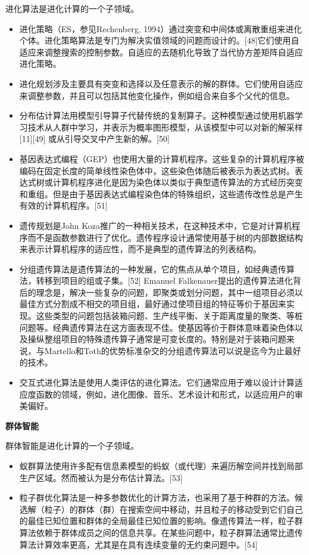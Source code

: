 进化算法是进化计算的一个子领域。
\begin{itemize}
\item 进化策略（ES，参见Rechenberg, 1994）通过突变和中间体或离散重组来进化个体。进化策略算法是专门为解决实值领域的问题而设计的。[48]它们使用自适应来调整搜索的控制参数。自适应的去随机化导致了当代协方差矩阵自适应进化策略。
\item 进化规划涉及主要具有突变和选择以及任意表示的解的群体。它们使用自适应来调整参数，并且可以包括其他变化操作，例如组合来自多个父代的信息。
\item 分布估计算法用模型引导算子代替传统的复制算子。这种模型通过使用机器学习技术从人群中学习，并表示为概率图形模型，从该模型中可以对新的解采样[11][49] 或从引导交叉中产生新的解。[50]
\item 基因表达式编程（GEP）也使用大量的计算机程序。这些复杂的计算机程序被编码在固定长度的简单线性染色体中，这些染色体随后被表示为表达式树。表达式树或计算机程序进化是因为染色体以类似于典型遗传算法的方式经历突变和重组。但是由于基因表达式编程染色体的特殊组织，这些遗传改性总是产生有效的计算机程序。[51]
\item 遗传规划是John Koza推广的一种相关技术，在这种技术中，它是对计算机程序而不是函数参数进行了优化。遗传程序设计通常使用基于树的内部数据结构来表示计算机程序的适应性，而不是典型的遗传算法的列表结构。
\item 分组遗传算法是遗传算法的一种发展，它的焦点从单个项目，如经典遗传算法，转移到项目的组或子集。[52] Emanuel Falkenauer提出的遗传算法进化背后的理念是，解决一些复杂的问题，即聚类或划分问题，其中一组项目必须以最佳方式分割成不相交的项目组，最好通过使项目组的特征等价于基因来实现。这些类型的问题包括装箱问题、生产线平衡、关于距离度量的聚类、等桩问题等。经典遗传算法在这方面表现不佳。使基因等价于群体意味着染色体以及操纵整组项目的特殊遗传算子通常是可变长度的。特别是对于装箱问题来说，与Martello和Toth的优势标准杂交的分组遗传算法可以说是迄今为止最好的技术。
\item 交互式进化算法是使用人类评估的进化算法。它们通常应用于难以设计计算适应度函数的领域，例如，进化图像、音乐、艺术设计和形式，以适应用户的审美偏好。
\end{itemize}

\textbf{群体智能}

群体智能是进化计算的一个子领域。
\begin{itemize}
\item 蚁群算法使用许多配有信息素模型的蚂蚁（或代理）来遍历解空间并找到局部生产区域。然而被认为是分布估计算法。[53]
\item 粒子群优化算法是一种多参数优化的计算方法，也采用了基于种群的方法。候选解（粒子）的群体（群）在搜索空间中移动，并且粒子的移动受到它们自己的最佳已知位置和群体的全局最佳已知位置的影响。像遗传算法一样，粒子群算法依赖于群体成员之间的信息共享。在某些问题中，粒子群算法通常比遗传算法计算效率更高，尤其是在具有连续变量的无约束问题中。[54]
\end{itemize}

